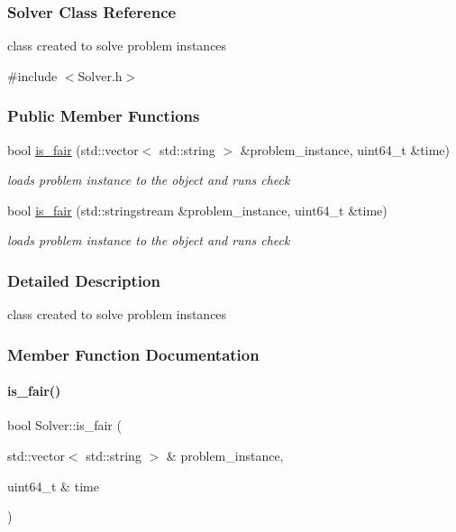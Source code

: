 \hypertarget{classSolver}{}\subsubsection{Solver Class Reference}
\label{classSolver}

class created to solve problem instances  

{\ttfamily \#include $<$Solver.\+h$>$}

\subsubsection*{Public Member Functions}
\begin{DoxyCompactItemize}
\item 
bool \hyperlink{classSolver_ad5bd9bb351afc77a23a83dc735983975}{is\+\_\+fair} (std\+::vector$<$ std\+::string $>$ \&problem\+\_\+instance, uint64\+\_\+t \&time)
\begin{DoxyCompactList}\small\item\em loads problem instance to the object and runs check \end{DoxyCompactList}\item 
bool \hyperlink{classSolver_a3583436284fe72faf2459461ad6de65c}{is\+\_\+fair} (std\+::stringstream \&problem\+\_\+instance, uint64\+\_\+t \&time)
\begin{DoxyCompactList}\small\item\em loads problem instance to the object and runs check \end{DoxyCompactList}\end{DoxyCompactItemize}


\subsubsection{Detailed Description}
class created to solve problem instances 

\subsubsection{Member Function Documentation}
\mbox{\label{classSolver_ad5bd9bb351afc77a23a83dc735983975}} 
\paragraph{\texorpdfstring{is\+\_\+fair()}{is\_fair()}\hspace{0.1cm}{\footnotesize\ttfamily [1/2]}}
{\footnotesize\ttfamily bool Solver\+::is\+\_\+fair (\begin{DoxyParamCaption}\item[{std\+::vector$<$ std\+::string $>$ \&}]{problem\+\_\+instance,  }\item[{uint64\+\_\+t \&}]{time }\end{DoxyParamCaption})}

